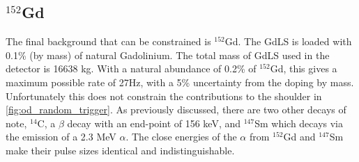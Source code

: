 






\subsection{${}^{152}$Gd}
\par
The final background that can be constrained is ${}^{152}$Gd.
The GdLS is loaded with 0.1\% (by mass) of natural Gadolinium.
The total mass of GdLS used in the detector is 16638 kg.
With a natural abundance of 0.2\% of ${}^{152}$Gd, this gives a maximum possible rate of 27Hz, with a 5\% uncertainty from the doping by mass.
Unfortunately this does not constrain the contributions to the shoulder in \autoref{fig:od_random_trigger}.
As previously discussed, there are two other decays of note, ${}^{14}$C, a $\beta$ decay with an end-point of 156 keV, and ${}^{147}$Sm which decays via the emission of a 2.3 MeV $\alpha$.
The close energies of the $\alpha$ from ${}^{152}$Gd and ${}^{147}$Sm make their pulse sizes identical and indistinguishable.


